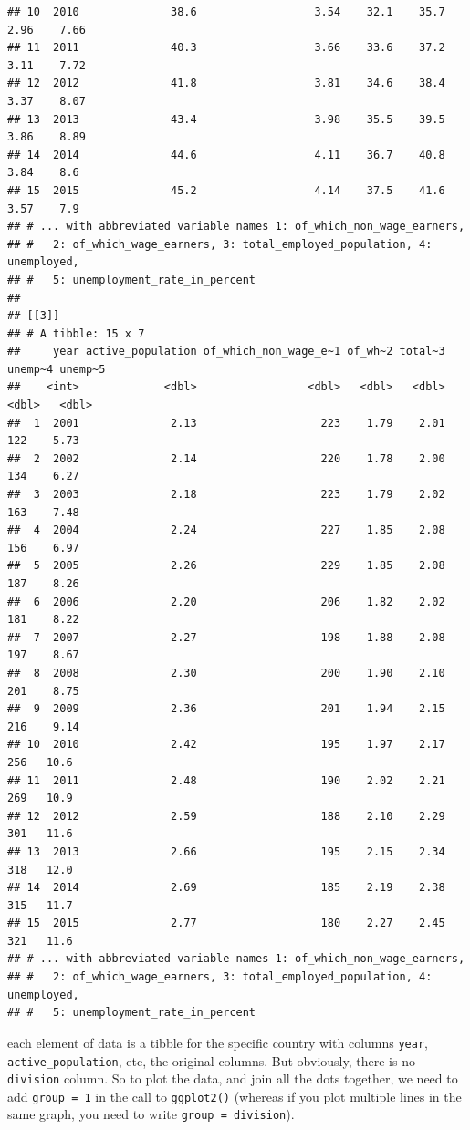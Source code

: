 \documentclass[
]{article}
\begin{document}
\begin{verbatim}
## 10  2010              38.6                  3.54    32.1    35.7    2.96    7.66
## 11  2011              40.3                  3.66    33.6    37.2    3.11    7.72
## 12  2012              41.8                  3.81    34.6    38.4    3.37    8.07
## 13  2013              43.4                  3.98    35.5    39.5    3.86    8.89
## 14  2014              44.6                  4.11    36.7    40.8    3.84    8.6 
## 15  2015              45.2                  4.14    37.5    41.6    3.57    7.9 
## # ... with abbreviated variable names 1: of_which_non_wage_earners,
## #   2: of_which_wage_earners, 3: total_employed_population, 4: unemployed,
## #   5: unemployment_rate_in_percent
## 
## [[3]]
## # A tibble: 15 x 7
##     year active_population of_which_non_wage_e~1 of_wh~2 total~3 unemp~4 unemp~5
##    <int>             <dbl>                 <dbl>   <dbl>   <dbl>   <dbl>   <dbl>
##  1  2001              2.13                   223    1.79    2.01     122    5.73
##  2  2002              2.14                   220    1.78    2.00     134    6.27
##  3  2003              2.18                   223    1.79    2.02     163    7.48
##  4  2004              2.24                   227    1.85    2.08     156    6.97
##  5  2005              2.26                   229    1.85    2.08     187    8.26
##  6  2006              2.20                   206    1.82    2.02     181    8.22
##  7  2007              2.27                   198    1.88    2.08     197    8.67
##  8  2008              2.30                   200    1.90    2.10     201    8.75
##  9  2009              2.36                   201    1.94    2.15     216    9.14
## 10  2010              2.42                   195    1.97    2.17     256   10.6 
## 11  2011              2.48                   190    2.02    2.21     269   10.9 
## 12  2012              2.59                   188    2.10    2.29     301   11.6 
## 13  2013              2.66                   195    2.15    2.34     318   12.0 
## 14  2014              2.69                   185    2.19    2.38     315   11.7 
## 15  2015              2.77                   180    2.27    2.45     321   11.6 
## # ... with abbreviated variable names 1: of_which_non_wage_earners,
## #   2: of_which_wage_earners, 3: total_employed_population, 4: unemployed,
## #   5: unemployment_rate_in_percent
\end{verbatim}

each element of data is a tibble for the specific country with columns \texttt{year}, \texttt{active\_population},
etc, the original columns. But obviously, there is no \texttt{division} column. So to plot the data, and
join all the dots together, we need to add \texttt{group\ =\ 1} in the call to \texttt{ggplot2()} (whereas if you
plot multiple lines in the same graph, you need to write \texttt{group\ =\ division}).
\end{document}
